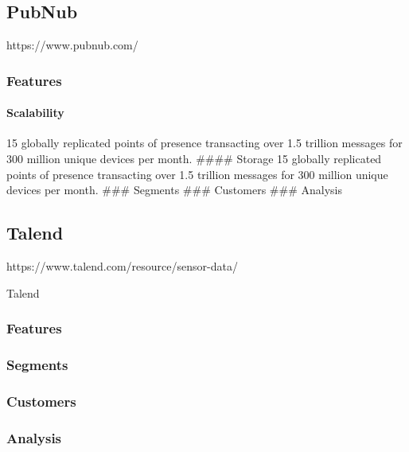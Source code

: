 \subsection{PubNub}\label{pubnub}

https://www.pubnub.com/

\subsubsection{Features}\label{features-1}

\paragraph{Scalability}\label{scalability}

15 globally replicated points of presence transacting over 1.5 trillion
messages for 300 million unique devices per month. \#\#\#\# Storage 15
globally replicated points of presence transacting over 1.5 trillion
messages for 300 million unique devices per month. \#\#\# Segments
\#\#\# Customers \#\#\# Analysis

\subsection{Talend}\label{talend}

https://www.talend.com/resource/sensor-data/

Talend

\subsubsection{Features}\label{features-2}

\subsubsection{Segments}\label{segments-1}

\subsubsection{Customers}\label{customers-1}

\subsubsection{Analysis}\label{analysis-1}
